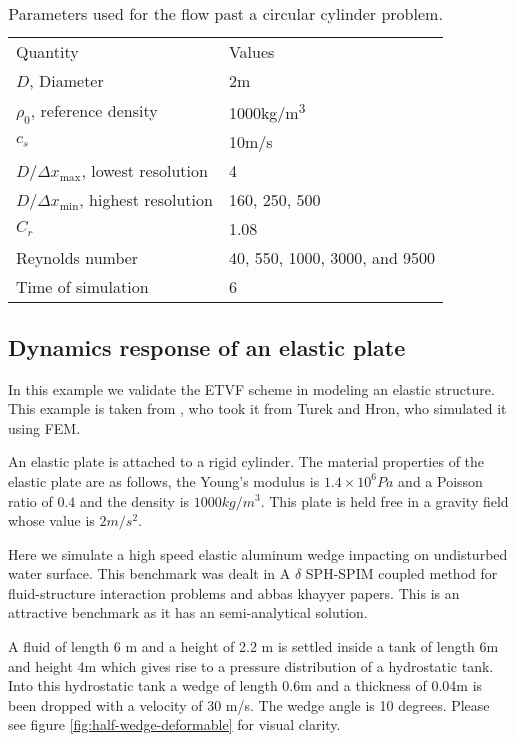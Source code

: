 \documentclass[preprint,12pt]{elsarticle}
\begin{document}
\begin{table}[!ht]
  \centering
  \begin{tabular}[!ht]{ll}
    Quantity & Values \\
    $D$, Diameter & 2m \\
    $\rho_0$, reference density & 1000kg/m\textsuperscript{3} \\
    $c_s$ & 10m/s \\
    $D/\Delta x_{\max}$, lowest resolution & 4 \\
    $D/\Delta x_{\min} $, highest resolution & 160, 250, 500\\
    $C_r$ & 1.08 \\
    Reynolds number & 40, 550, 1000, 3000, and 9500 \\
    Time of simulation & 6 \\
  \end{tabular}
  \caption{Parameters used for the flow past a circular cylinder problem.}%
  \label{tab:fpc-params}
\end{table}


\subsection{Dynamics response of an elastic plate}
\label{sec:elastic-plate}

In this example we validate the ETVF scheme in modeling an elastic structure.
This example is taken from \cite{Sun2019study}, who took it from Turek and
Hron, who simulated it using FEM.

An elastic plate is attached to a rigid cylinder. The material properties of
the elastic plate are as follows, the Young's modulus is $1.4\times10^6Pa$ and
a Poisson ratio of $0.4$ and the density is $1000 kg/m^3$. This plate is held
free in a gravity field whose value is $2m/s^2$.


Here we simulate a high speed elastic aluminum wedge impacting on undisturbed
water surface. This benchmark was dealt in
{A $\delta$ SPH-SPIM coupled method for fluid-structure interaction problems} and
{abbas khayyer} papers.
This is an attractive benchmark as it has an semi-analytical solution.

A fluid of length 6 m and a height of 2.2 m is settled inside a tank of length
6m and height 4m which gives rise to a pressure distribution of a hydrostatic
tank. Into this hydrostatic tank a wedge of length 0.6m and a thickness of
0.04m is been dropped with a velocity of 30 m/s. The wedge angle is 10
degrees. Please see figure \ref{fig:half-wedge-deformable} for visual clarity.
\end{document}
